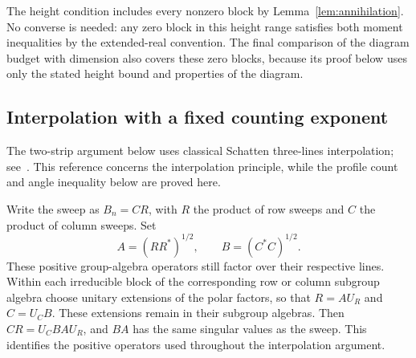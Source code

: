 The height condition includes every nonzero block by
Lemma~\ref{lem:annihilation}.  No converse is needed: any zero block
in this height range satisfies both moment inequalities by the
extended-real convention.  The final comparison of the diagram budget
with dimension also covers these zero blocks, because its proof below
uses only the stated height bound and properties of the diagram.

\subsection{Interpolation with a fixed counting exponent}

The two-strip argument below uses classical Schatten three-lines
interpolation; see~\cite[Section 3.1, Theorem 3.1]{SutterBertaTomamichel2017}.
This reference concerns the interpolation principle, while the profile
count and angle inequality below are proved here.

Write the sweep as $B_n=CR$, with $R$ the product of row sweeps
and $C$ the product of column sweeps. Set
\[
 A=(RR^*)^{1/2},\qquad B=(C^*C)^{1/2}.
\]
These positive group-algebra operators still factor over their respective
lines. Within each irreducible block of the corresponding row or column
subgroup algebra choose unitary extensions of the polar factors, so that
$R=AU_R$ and $C=U_CB$. These extensions remain in their subgroup
algebras. Then $CR=U_CBAU_R$,
and $BA$ has the same singular values as the sweep. This identifies the
positive operators used throughout the interpolation argument.

